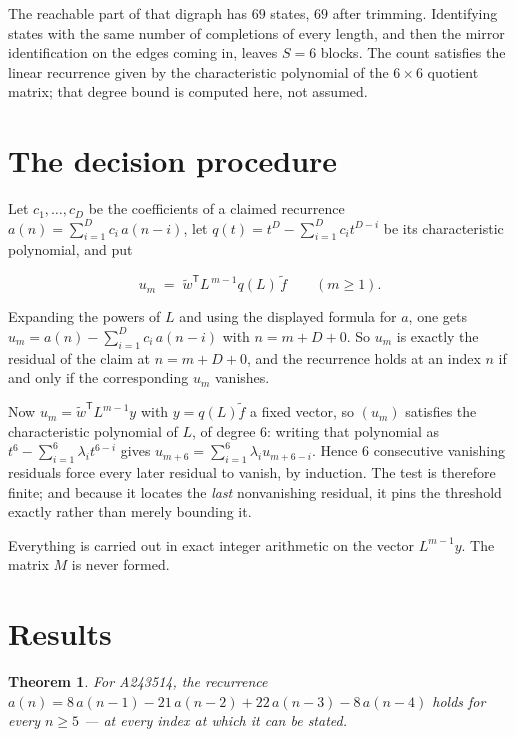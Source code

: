 \documentclass[11pt]{article}
\newtheorem{theorem}{Theorem}
\theoremstyle{definition}
\begin{document}
The reachable part of that digraph has $69$ states, $69$ after trimming. Identifying states with the same number of completions of every length, and then the mirror identification on the edges coming in, leaves $S = 6$ blocks. The count satisfies the linear recurrence given by the characteristic polynomial of the $6\times6$ quotient matrix; that degree bound is computed here, not assumed.

\section{The decision procedure}

Let $c_1,\dots,c_D$ be the coefficients of a claimed recurrence $a(n) = \sum_{i=1}^{D} c_i\,a(n-i)$, let $q(t) = t^{D} - \sum_{i=1}^{D} c_i t^{D-i}$ be its characteristic polynomial, and put

\[u_m \;=\; \tilde w^{\mathsf T} L^{\,m-1} q(L)\,\tilde f \qquad (m \ge 1).\]

Expanding the powers of $L$ and using the displayed formula for $a$, one gets $u_m = a(n) - \sum_{i=1}^{D} c_i\,a(n-i)$ with $n = m + D + 0$. So $u_m$ is exactly the residual of the claim at $n = m + D + 0$, and the recurrence holds at an index $n$ if and only if the corresponding $u_m$ vanishes.

Now $u_m = \tilde w^{\mathsf T} L^{m-1} y$ with $y = q(L)\tilde f$ a fixed vector, so $(u_m)$ satisfies the characteristic polynomial of $L$, of degree $6$: writing that polynomial as $t^{6} - \sum_{i=1}^{6} \lambda_i t^{6-i}$ gives $u_{m+6} = \sum_{i=1}^{6} \lambda_i u_{m+6-i}$. Hence $6$ consecutive vanishing residuals force every later residual to vanish, by induction. The test is therefore finite; and because it locates the {\itshape last} nonvanishing residual, it pins the threshold exactly rather than merely bounding it.

Everything is carried out in exact integer arithmetic on the vector $L^{m-1}y$. The matrix $M$ is never formed.

\section{Results}

\begin{theorem} For A243514, the recurrence $a(n) = 8\,a(n-1) - 21\,a(n-2) + 22\,a(n-3) - 8\,a(n-4)$ holds for every $n \ge 5$ --- at every index at which it can be stated.\end{theorem}
\end{document}
